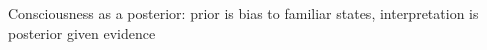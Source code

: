 \documentclass{article}
\begin{document}
Consciousness as a posterior: prior is bias to familiar states, interpretation
is posterior given evidence



%
\newpage

\end{document}
